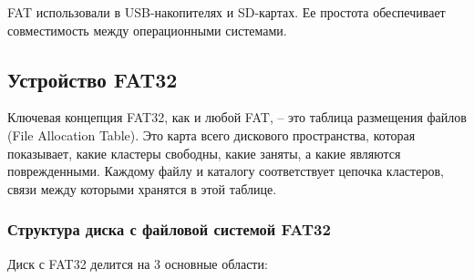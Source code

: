 FAT использовали в USB-накопителях и SD-картах. Ее простота обеспечивает совместимость между операционными системами.

\subsection{Устройство FAT32}

Ключевая концепция FAT32, как и любой FAT, -- это таблица размещения файлов (File Allocation Table). Это карта всего дискового пространства, которая показывает, какие кластеры свободны, какие заняты, а какие являются поврежденными. Каждому файлу и каталогу соответствует цепочка кластеров, связи между которыми хранятся в этой таблице.

\subsubsection{Структура диска с файловой системой FAT32}

Диск с FAT32 делится на 3 основные области:

